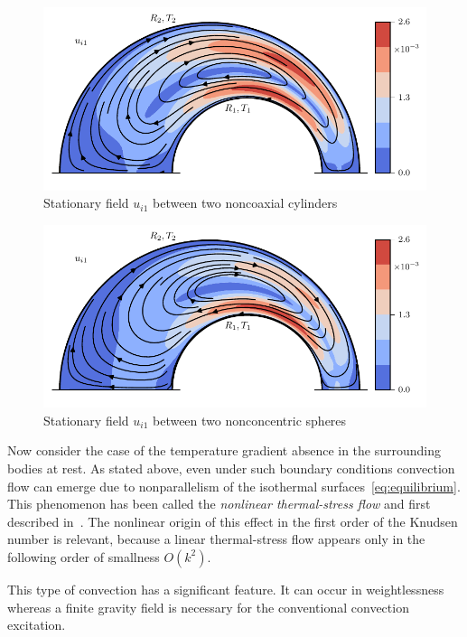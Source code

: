 \documentclass[smallextended, referee]{svjour3} %
\begin{document}
\begin{figure}
	\centering
	\includegraphics{Fig7}
	\caption{Stationary field \(u_{i1}\) between two noncoaxial cylinders}\label{fig:cylinders}
\end{figure}

\begin{figure}
	\centering
	\includegraphics{Fig8}
	\caption{Stationary field \(u_{i1}\) between two nonconcentric spheres}\label{fig:spheres}
\end{figure}

Now consider the case of the temperature gradient absence in the surrounding bodies at rest.
As stated above, even under such boundary conditions convection flow can emerge
due to nonparallelism of the isothermal surfaces~\eqref{eq:equilibrium}.
This phenomenon has been called the \textit{nonlinear thermal-stress flow} and first described in~\cite{Kogan1971}.
The nonlinear origin of this effect in the first order of the Knudsen number is relevant,
because a linear thermal-stress flow appears only in the following order of smallness \(O(k^2)\).

This type of convection has a significant feature. It can occur in weightlessness
whereas a finite gravity field is necessary for the conventional convection excitation.
\end{document}
